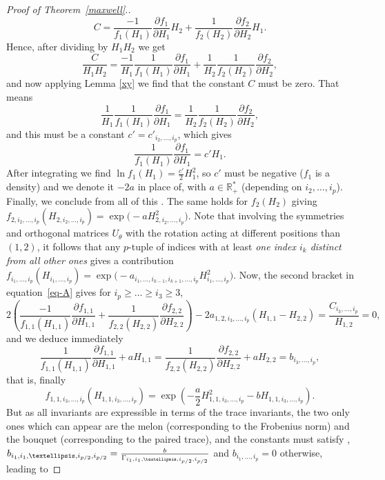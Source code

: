 \documentclass[10pt,a4paper]{amsart}
\begin{document}
\begin{proof}[Proof of Theorem~\ref{maxwell}.]
\[C = \frac{-1}{f_1(H_1)} \frac{\partial f_{1}}{\partial H_{1}} H_2 + \frac{1}{f_2(H_2)} \frac{\partial f_{2}}{\partial H_{2}} H_1. \]
Hence, after dividing by $H_1H_2$ we get
\[ \frac{C}{H_1H_2} = \frac{-1}{H_1} \frac{1}{f_1(H_1)} \frac{\partial f_{1}}{\partial H_{1}} + \frac{1}{H_2}\frac{1}{f_2(H_2)} \frac{\partial f_{2}}{\partial H_{2}}, \]
and now applying Lemma \ref{xy} we find that the constant $C$ must be zero. That means
\[ \frac{1}{H_1} \frac{1}{f_1(H_1)} \frac{\partial f_{1}}{\partial H_{1}} = \frac{1}{H_2}\frac{1}{f_2(H_2)} \frac{\partial f_{2}}{\partial H_{2}}, \]
and this must be a constant $c'=c'_{i_2,\dots,i_p}$, which gives
\[\frac{1}{f_1(H_1)} \frac{\partial f_{1}}{\partial H_{1}} = c' H_1.\]
After integrating we find $\ln f_1(H_1) = \frac{c'}{2} H_1^2$, so $c'$ must be negative ($f_1$ is a density) and we denote it $-2a$ in place of, with $a \in \mathbb{R}^*_+$ (depending on ${i_2,\dots,i_p}$). Finally, we conclude from all of this
.
The same holds for $f_2(H_2)$ giving $f_{2,i_{2},\dots,i_p}(H_{2,i_{2},\dots,i_p}) = \exp\bigl(-a H_{2,i_{2},\dots,i_p}^2\bigr)$.
Note that involving the symmetries and orthogonal matrices $U_{\theta}$ with the rotation acting at different positions than~$(1,2)$, it follows that any $p$-tuple of indices with at least {\em one index $i_k$ distinct from all other ones} gives a contribution~${f_{i_{1},\dots,i_p}(H_{i_{1},\dots,i_p}) = \exp\bigl(-a_{i_1,\dots,i_{k-1},i_{k+1},\dots,i_p} H_{i_{1},\dots,i_p}^2\bigr)}$. Now, the second bracket in equation~\eqref{eq-A} gives for $i_p\geq\dots\geq i_3\geq 3$,
\[ 2 \left( \frac{-1}{f_{1,1}(H_{1,1})} \frac{\partial f_{1,1}}{\partial H_{1,1}} + \frac{1}{f_{2,2}(H_{2,2})} \frac{\partial f_{2,2}}{\partial H_{2,2}} \right) -2a_{1,2,i_3,\dots,i_p} (H_{1,1} - H_{2,2}) = \frac{C_{i_3,\dots,i_p}}{H_{1,2}} =0,\]
and we deduce immediately
\[ \frac{1}{f_{1,1}(H_{1,1})} \frac{\partial f_{1,1}}{\partial H_{1,1}} + a H_{1,1} = \frac{1}{f_{2,2}(H_{2,2})} \frac{\partial f_{2,2}}{\partial H_{2,2}} + a H_{2,2} = b_{i_3,\dots,i_p},\]
that is, finally
\[ f_{1,1,i_{3},\dots,i_p}(H_{1,1,i_{3},\dots,i_p}) = \exp\left(-\frac{a}{2} H_{1,1,i_{3},\dots,i_p}^2-bH_{1,1,i_{3},\dots,i_p}\right). \]
But as all invariants are expressible in terms of the trace invariants, the two only ones which can appear are the melon (corresponding to the Frobenius norm) and the bouquet (corresponding to the paired trace), and the constants must satisfy , $b_{i_1,i_1,\dots,i_{p/2},i_{p/2}}=\smash{\frac{b}{\Gamma_{i_1,i_1,\dots,i_{p/2},i_{p/2}} }}$ and $b_{i_1,\dots,i_p}=0$ otherwise, leading to

\end{proof}
\end{document}
